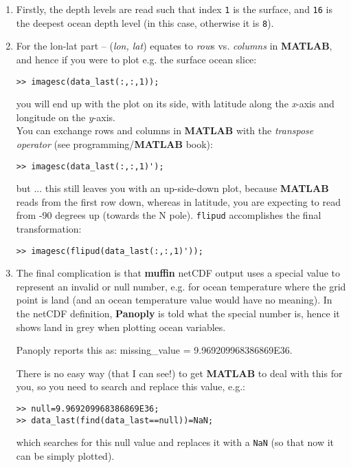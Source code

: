\documentclass[11pt,fleqn]{book} %
\begin{document}
\begin{enumerate}
\setlength{\itemindent}{.2in}

\vspace{1mm}
\item Firstly, the depth levels are read such that index \texttt{1} is the surface, and \texttt{16} is the deepest ocean depth level (in this case, otherwise it is \texttt{8}).

\vspace{1mm}
\item For the lon-lat part -- (\textit{lon, lat}) equates to \textit{row}\textit{}s vs. \textit{columns} in \textbf{MATLAB}, and hence if you were to plot e.g. the surface ocean slice:
\begin{verbatim}
>> imagesc(data_last(:,:,1));
\end{verbatim}
you will end up with the plot on its side, with latitude along the \textit{x}-axis and longitude on the \textit{y}-axis.
\\You can exchange rows and columns in \textbf{MATLAB} with the \textit{transpose operator} (see programming/\textbf{MATLAB} book):
\begin{verbatim}
>> imagesc(data_last(:,:,1)');
\end{verbatim}
but ... this still leaves you with an up-side-down plot, because \textbf{MATLAB} reads from the first row down, whereas in latitude, you are expecting to read from -90 degrees up (towards the N pole). \texttt{flipud} accomplishes the final transformation:
\begin{verbatim}
>> imagesc(flipud(data_last(:,:,1)'));
\end{verbatim}

\vspace{1mm}
\item The final complication is that \textbf{muffin} netCDF output uses a special value to represent an invalid or null number, e.g. for ocean temperature where the grid point is land (and an ocean temperature value would have no meaning). In the netCDF definition, \textbf{Panoply} is told what the special number is, hence it shows land in grey when plotting ocean variables.

Panoply reports this as: \textsf{\footnotesize missing\_value = 9.969209968386869E36}.

\vspace{1mm}
There is no easy way (that I can see!) to get \textbf{MATLAB} to deal with this for you, so you need to search and replace this value, e.g.:
\small\begin{verbatim}
>> null=9.969209968386869E36;
>> data_last(find(data_last==null))=NaN;
\end{verbatim}\normalsize
which searches for this null value and replaces it with a \texttt{NaN} (so that now it can be simply plotted).

\end{enumerate}
\vspace{2mm}
\end{document}
